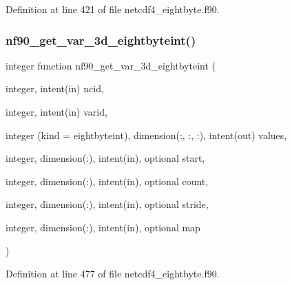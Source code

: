 Definition at line 421 of file netcdf4\+\_\+eightbyte.\+f90.

\mbox{\label{netcdf4__eightbyte_8f90_a8fa455e882db95833737abdb421cf413}} 
\subsubsection{\texorpdfstring{nf90\+\_\+get\+\_\+var\+\_\+3d\+\_\+eightbyteint()}{nf90\_get\_var\_3d\_eightbyteint()}}
{\footnotesize\ttfamily integer function nf90\+\_\+get\+\_\+var\+\_\+3d\+\_\+eightbyteint (\begin{DoxyParamCaption}\item[{integer, intent(in)}]{ncid,  }\item[{integer, intent(in)}]{varid,  }\item[{integer (kind = eightbyteint), dimension(\+:, \+:, \+:), intent(out)}]{values,  }\item[{integer, dimension(\+:), intent(in), optional}]{start,  }\item[{integer, dimension(\+:), intent(in), optional}]{count,  }\item[{integer, dimension(\+:), intent(in), optional}]{stride,  }\item[{integer, dimension(\+:), intent(in), optional}]{map }\end{DoxyParamCaption})}



Definition at line 477 of file netcdf4\+\_\+eightbyte.\+f90.

\mbox{\label{netcdf4__eightbyte_8f90_a13a8c596ce2cddbdd93d52adba8ed05f}} 
